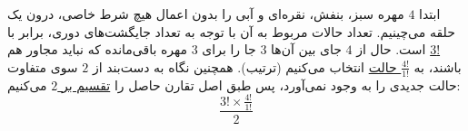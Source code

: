 \p
ابتدا 
$4$
مهره سبز، بنفش، نقره‌ای و آبی را بدون اعمال هیچ شرط خاصی، درون یک حلقه می‌چینیم. تعداد حالات مربوط به آن با توجه به تعداد جایگشت‌ها‌ی دوری، برابر با
\underline{!3}
است.
حال از
$4$
  جای بین آن‌ها 
$3$
   جا را برای 
$3$
    مهره باقی‌مانده که نباید مجاور هم باشند، به
    \underline{$\frac{4!}{1!}$ حالت}
    انتخاب می‌کنیم
     (ترتیب).
      همچنین نگاه به دست‌بند از
$2$
    سوی متفاوت حالت جدیدی را به وجود نمی‌آورد، پس طبق اصل تقارن حاصل را  
    \underline{تقسیم بر $2$}
    می‌کنیم:
    $$\frac{3!\times \frac{4!}{1!}}{2}$$